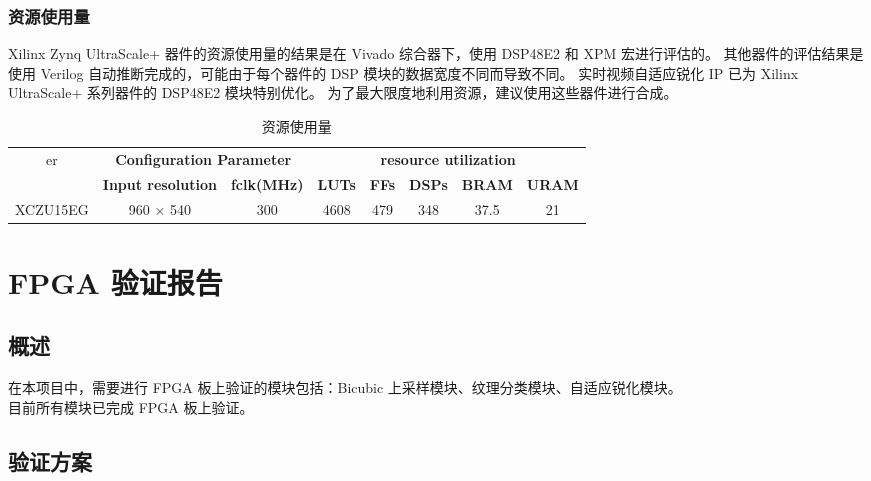 \documentclass[12pt, a4paper, oneside]{ctexbook}
\begin{document}
	\subsection{资源使用量}	
	Xilinx Zynq UltraScale+ 器件的资源使用量的结果是在 Vivado 综合器下，使用 DSP48E2 和 XPM 宏进行评估的。
	其他器件的评估结果是使用 Verilog 自动推断完成的，可能由于每个器件的 DSP 模块的数据宽度不同而导致不同。
	实时视频自适应锐化 IP 已为 Xilinx UltraScale+ 系列器件的 DSP48E2 模块特别优化。
	为了最大限度地利用资源，建议使用这些器件进行合成。
	\begin{table}[h]
		\centering
		\begin{tabular}{|c|cc|ccccc|}
			\hline
er			\multirow{2}{*}{\textbf{Device}} & \multicolumn{2}{c|}{\textbf{Configuration Parameter}}               & \multicolumn{5}{c|}{\textbf{resource utilization}}                                                                                                               \\ \cline{2-8} 
			& \multicolumn{1}{c|}{\textbf{Input resolution}} & \textbf{fclk(MHz)} & \multicolumn{1}{c|}{\textbf{LUTs}} & \multicolumn{1}{c|}{\textbf{FFs}} & \multicolumn{1}{c|}{\textbf{DSPs}} & \multicolumn{1}{c|}{\textbf{BRAM}} & \textbf{URAM} \\ \hline
			XCZU15EG                         & \multicolumn{1}{c|}{960 × 540}                 & 300                & \multicolumn{1}{c|}{4608}           & \multicolumn{1}{c|}{479}         & \multicolumn{1}{c|}{348}           & \multicolumn{1}{c|}{37.5}             & 21            \\ \hline
		\end{tabular}
		\caption{资源使用量}
	\end{table}
	
	\chapter{FPGA 验证报告}
	\section{概述}
	在本项目中，需要进行 FPGA 板上验证的模块包括：Bicubic 上采样模块、纹理分类模块、自适应锐化模块。\\
	
	目前所有模块已完成 FPGA 板上验证。
	
	\section{验证方案}
\end{document}
